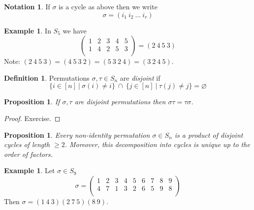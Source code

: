 \documentclass[12pt, letterpaper, oneside]{article}
\theoremstyle{plain}
\newtheorem{proposition}[theorem]{Proposition}
\theoremstyle{definition}
\newtheorem{definition}[theorem]{Definition}
\newtheorem{example}[theorem]{Example}
\newtheorem{notation}[theorem]{Notation}
\newcommand{\vs}{\vskip 5mm}
\begin{document}
\vs\vs

\begin{notation}
If $\sigma$ is a cycle as above then we write
$$\sigma = (i_{1} \  i_{2} \  \dots \  i_{r})$$

\end{notation}

\vs\vs

\begin{example}
In $S_{5}$ we have 
$$
\begin{pmatrix}
1 & 2 & 3 & 4 & 5 \\[2mm]
1 & 4 & 2 & 5 & 3 \\
\end{pmatrix}
= (2 \ 4\ 5\ 3)
$$
Note: $ (2 \ 4\ 5\ 3) =  (4\ 5\ 3\ 2) = (5\ 3\ 2\ 4) = (3\ 2\ 4\ 5)$.
\end{example}

\vs\vs

\begin{definition}
Permutations $\sigma, \tau\in S_{n}$ are \emph{disjoint} if 
$$\{i\in [n] \ | \  \sigma(i) \neq i \} \ \cap\  \{j\in [n] \ | \ \tau(j) \neq j \} = \varnothing$$
\end{definition}

\vs\vs

\begin{proposition}
If $\sigma, \tau$ are disjoint permutations then $\sigma\tau = \tau\sigma$.
\end{proposition}

\begin{proof}
Exercise.
\end{proof}


\vs\vs


\begin{proposition}
\label{PROP_CYCLEDECOMP}
Every non-identity permutation $\sigma\in S_{n}$ is a product of disjoint cycles of length $\geq 2$.
Moreover, this decomposition into cycles is unique up to the order of factors.  
\end{proposition}

\vs\vs

\begin{example}
Let $\sigma\in S_{9}$
$$
\sigma = 
\begin{pmatrix}
1 & 2 & 3 & 4 & 5 & 6 & 7 & 8 & 9\\[2mm]
4 & 7 & 1 & 3 & 2 & 6 & 5 &  9 & 8\\
\end{pmatrix}
$$
Then $\sigma = (1 \ 4\ 3)(2\ 7\ 5)(8\ 9)$.
\end{example}
\end{document}
